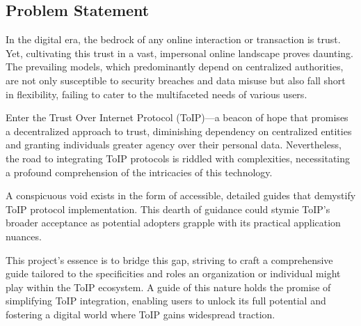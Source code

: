 \subsection{Problem Statement}

In the digital era, the bedrock of any online interaction or transaction is trust. Yet, cultivating this trust in a vast, impersonal online landscape proves daunting. The prevailing models, which predominantly depend on centralized authorities, are not only susceptible to security breaches and data misuse but also fall short in flexibility, failing to cater to the multifaceted needs of various users.

Enter the Trust Over Internet Protocol (ToIP)—a beacon of hope that promises a decentralized approach to trust, diminishing dependency on centralized entities and granting individuals greater agency over their personal data. Nevertheless, the road to integrating ToIP protocols is riddled with complexities, necessitating a profound comprehension of the intricacies of this technology.

A conspicuous void exists in the form of accessible, detailed guides that demystify ToIP protocol implementation. This dearth of guidance could stymie ToIP's broader acceptance as potential adopters grapple with its practical application nuances.

This project's essence is to bridge this gap, striving to craft a comprehensive guide tailored to the specificities and roles an organization or individual might play within the ToIP ecosystem. A guide of this nature holds the promise of simplifying ToIP integration, enabling users to unlock its full potential and fostering a digital world where ToIP gains widespread traction.
